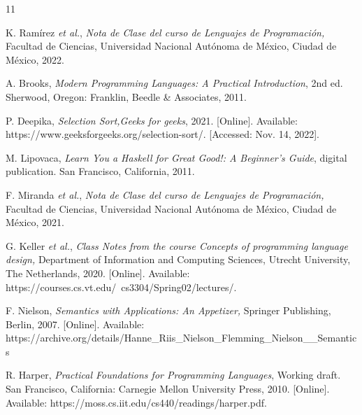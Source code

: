 
\begin{thebibliography}{11}


    \label{sec:1}
    \hypertarget{1}{}
    K. Ramírez \textit{et al.}, \textit{Nota de Clase del curso de Lenguajes de Programación, }Facultad de Ciencias, Universidad Nacional Autónoma de México, Ciudad de México, 2022.

    
    \label{sec:2}
    \hypertarget{2}{}
    A. Brooks, \textit{Modern Programming Languages: A Practical Introduction}, 2nd ed. Sherwood, Oregon: Franklin, Beedle \& Associates, 2011.


    \label{sec:3}
    \hypertarget{3}{}
    P. Deepika, \textit{Selection Sort,}\textit{Geeks for geeks}, 2021. [Online]. Available: https://www.geeksforgeeks.org/selection-sort/. [Accessed: Nov. 14, 2022].
 
    \label{sec:4}
    \hypertarget{4}{}
    M. Lipovaca, \textit{Learn You a Haskell for Great Good!: A Beginner's Guide}, digital publication. San Francisco, California, 2011.
    
    \label{sec:5}
    \hypertarget{5}{}
    F. Miranda \textit{et al.}, \textit{Nota de Clase del curso de Lenguajes de Programación, }Facultad de Ciencias, Universidad Nacional Autónoma de México, Ciudad de México, 2021.


    \label{sec:6}
    \hypertarget{6}{}
    G. Keller \textit{et al.}, \textit{Class Notes from the course Concepts of programming language design, }Department of Information and Computing Sciences, Utrecht University, The Netherlands, 2020. [Online]. Available: https://courses.cs.vt.edu/~cs3304/Spring02/lectures/.

    
    \label{swann}
    \label{sec:7}
    \hypertarget{7}{}
    F. Nielson, \textit{Semantics with Applications: An Appetizer, } Springer Publishing,  Berlin, 2007. [Online]. Available: https://archive.org/details/Hanne\_Riis\_Nielson\_Flemming\_Nielson\_\_Semantics

    
    \label{sec:8}
    \hypertarget{8}{}
    R. Harper, \textit{Practical Foundations for Programming Languages}, Working draft. San Francisco, California: Carnegie Mellon University Press, 2010. [Online]. Available: https://moss.cs.iit.edu/cs440/readings/harper.pdf.


\end{thebibliography}
